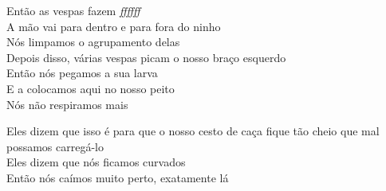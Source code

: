 \bigskip

\begin{linenumbers}\begingroup\raggedright
 
\noindent   Então as vespas fazem \emph{ffffff}\\
  A mão vai para dentro e para fora do ninho\\
  Nós limpamos o agrupamento delas\\
  Depois disso, várias vespas picam o nosso braço esquerdo\\
  Então nós pegamos a sua larva\\
  E a colocamos aqui no nosso peito\\
  Nós não respiramos mais
 
\end{linenumbers}\endgroup

\bigskip

\begin{linenumbers}\begingroup\raggedright
 
\noindent   Eles dizem que isso é para que o nosso cesto de caça fique tão cheio que mal possamos carregá-lo\\
  Eles dizem que nós ficamos curvados\\
  Então nós caímos muito perto, exatamente lá
 
\end{linenumbers}\endgroup

\bigskip

